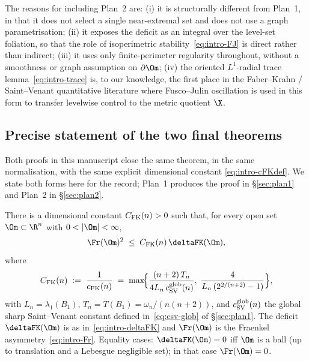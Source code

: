 The reasons for including Plan~2 are: (i) it is structurally
different from Plan~1, in that it does not select a single near-extremal
set and does not use a graph parametrisation; (ii) it exposes the
deficit as an integral over the level-set foliation, so that the role of
isoperimetric stability~\eqref{eq:intro-FJ} is direct rather than
indirect; (iii) it uses only finite-perimeter regularity throughout,
without a smoothness or graph assumption on $\partial\Om$; (iv) the
oriented $L^1$-radial trace lemma~\eqref{eq:intro-trace} is, to our
knowledge, the first place in the Faber--Krahn / Saint--Venant
quantitative literature where Fusco--Julin oscillation is used in this
form to transfer levelwise control to the metric quotient $\X$.

\subsection{Precise statement of the two final theorems}
\label{ssec:intro-final-thms}

Both proofs in this manuscript close the same theorem, in the same
normalisation, with the same explicit dimensional constant
\eqref{eq:intro-cFKdef}. We state both forms here for the record;
Plan~1 produces the proof in \S\ref{sec:plan1} and Plan~2 in
\S\ref{sec:plan2}.

\begin{theorem}
\label{thm:plan1-FK-upper-intro}
There is a dimensional constant $C_{\rm FK}(n)>0$ such that, for every
open set $\Om\subset\R^n$ with $0<|\Om|<\infty$,
\begin{equation}\label{eq:intro-plan1-FK}
   \Fr(\Om)^2\;\le\;C_{\rm FK}(n)\,\deltaFK(\Om),
\end{equation}
where
\[
   C_{\rm FK}(n)
   \;:=\;\frac{1}{c_{\rm FK}(n)}
   \;=\;\max\!\Bigl\{
      \frac{(n+2)\,T_n}{4 L_n\,c_{\rm SV}^{\rm glob}(n)},\;
      \frac{4}{L_n\,(2^{2/(n+2)}-1)}
   \Bigr\},
\]
with $L_n=\lambda_1(B_1)$, $T_n=T(B_1)=\omega_n/(n(n+2))$, and
$c_{\rm SV}^{\rm glob}(n)$ the global sharp Saint--Venant
constant defined in~\eqref{eq:csv-glob} of \S\ref{sec:plan1}. The
deficit $\deltaFK(\Om)$ is as in~\eqref{eq:intro-deltaFK} and
$\Fr(\Om)$ is the Fraenkel asymmetry~\eqref{eq:intro-Fr}.
Equality cases: $\deltaFK(\Om)=0$ iff $\Om$ is a ball (up to
translation and a Lebesgue negligible set); in that case
$\Fr(\Om)=0$.
\end{theorem}

